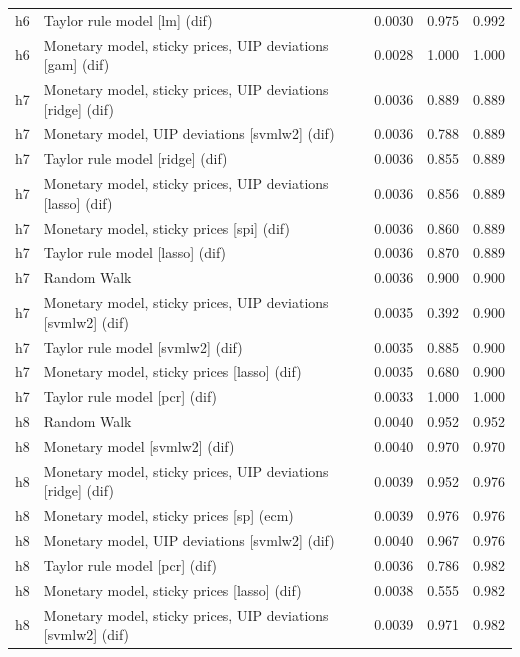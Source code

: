 \begin{ThreePartTable}
\begin{longtable}[t]{cp{5.5cm}ccc}
h6 & \raggedright Taylor rule model [lm] (dif) & 0.0030 & 0.975 & 0.992\\
h6 & \raggedright Monetary model, sticky prices, UIP deviations [gam] (dif) & 0.0028 & 1.000 & 1.000\\
\addlinespace
h7 & \raggedright Monetary model, sticky prices, UIP deviations [ridge] (dif) & 0.0036 & 0.889 & 0.889\\
h7 & \raggedright Monetary model, UIP deviations [svmlw2] (dif) & 0.0036 & 0.788 & 0.889\\
h7 & \raggedright Taylor rule model [ridge] (dif) & 0.0036 & 0.855 & 0.889\\
h7 & \raggedright Monetary model, sticky prices, UIP deviations [lasso] (dif) & 0.0036 & 0.856 & 0.889\\
h7 & \raggedright Monetary model, sticky prices [spi] (dif) & 0.0036 & 0.860 & 0.889\\
h7 & \raggedright Taylor rule model [lasso] (dif) & 0.0036 & 0.870 & 0.889\\
h7 & \raggedright Random Walk & 0.0036 & 0.900 & 0.900\\
h7 & \raggedright Monetary model, sticky prices, UIP deviations [svmlw2] (dif) & 0.0035 & 0.392 & 0.900\\
h7 & \raggedright Taylor rule model [svmlw2] (dif) & 0.0035 & 0.885 & 0.900\\
h7 & \raggedright Monetary model, sticky prices [lasso] (dif) & 0.0035 & 0.680 & 0.900\\
h7 & \raggedright Taylor rule model [pcr] (dif) & 0.0033 & 1.000 & 1.000\\
\addlinespace
h8 & \raggedright Random Walk & 0.0040 & 0.952 & 0.952\\
h8 & \raggedright Monetary model [svmlw2] (dif) & 0.0040 & 0.970 & 0.970\\
h8 & \raggedright Monetary model, sticky prices, UIP deviations [ridge] (dif) & 0.0039 & 0.952 & 0.976\\
h8 & \raggedright Monetary model, sticky prices [sp] (ecm) & 0.0039 & 0.976 & 0.976\\
h8 & \raggedright Monetary model, UIP deviations [svmlw2] (dif) & 0.0040 & 0.967 & 0.976\\
h8 & \raggedright Taylor rule model [pcr] (dif) & 0.0036 & 0.786 & 0.982\\
h8 & \raggedright Monetary model, sticky prices [lasso] (dif) & 0.0038 & 0.555 & 0.982\\
h8 & \raggedright Monetary model, sticky prices, UIP deviations [svmlw2] (dif) & 0.0039 & 0.971 & 0.982\\

\end{longtable}
\end{ThreePartTable}
